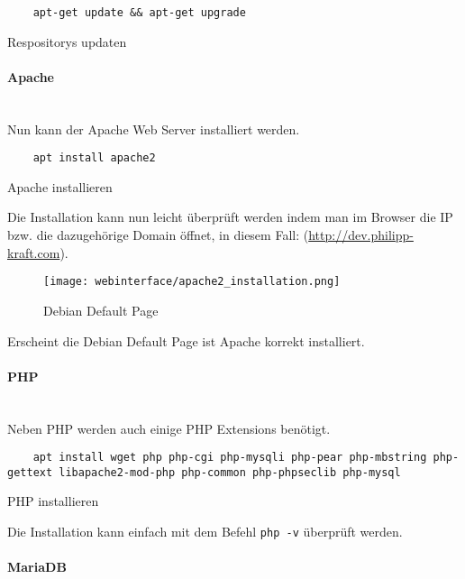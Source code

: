 \begin{listing}[H]
  \begin{verbatim}
    apt-get update && apt-get upgrade
  \end{verbatim}
  \caption{Respositorys updaten}
\end{listing}

\paragraph{Apache}\mbox{}\\

Nun kann der Apache Web Server installiert werden.

\begin{listing}[H]
  \begin{verbatim}
    apt install apache2
  \end{verbatim}
  \caption{Apache installieren}
\end{listing}

Die Installation kann nun leicht überprüft werden indem man im Browser die IP
bzw. die dazugehörige Domain öffnet, in diesem Fall:
(\url{http://dev.philipp-kraft.com}).

\begin{figure}[H]
  \centering
  \texttt{[image: webinterface/apache2\_installation.png]}
  \caption{Debian Default Page}
\end{figure}

Erscheint die Debian Default Page ist Apache korrekt installiert.

\paragraph{PHP}\mbox{}\\
Neben PHP werden auch einige PHP Extensions benötigt.

\begin{listing}[H]
  \begin{verbatim}
    apt install wget php php-cgi php-mysqli php-pear php-mbstring php-gettext libapache2-mod-php php-common php-phpseclib php-mysql
  \end{verbatim}
  \caption{PHP installieren}
\end{listing}

Die Installation kann einfach mit dem Befehl \verb|php -v| überprüft werden.

\paragraph{MariaDB}\mbox{}\\

